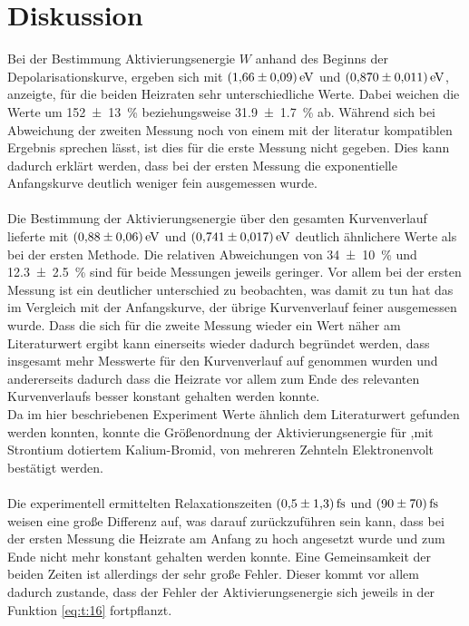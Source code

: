 \section{Diskussion}
\label{sec:Diskussion}
Bei der Bestimmung Aktivierungsenergie $W$ anhand des Beginns der Depolarisationskurve,
ergeben sich mit $\SI{1.66+-0.09}{\electronvolt}$ und $\SI{0.870+-0.011}{\electronvolt}$,
anzeigte, für die beiden Heizraten sehr unterschiedliche Werte. Dabei weichen die Werte um \SI{152+-13}{\percent} beziehungsweise \SI{31.9+-1.7}{\percent} ab.
Während sich bei Abweichung der zweiten Messung noch von einem mit der literatur kompatiblen Ergebnis sprechen lässt, ist dies für die erste Messung nicht
gegeben. Dies kann dadurch erklärt werden, dass bei der ersten Messung die exponentielle Anfangskurve deutlich weniger fein ausgemessen wurde.\\ \\
Die Bestimmung der Aktivierungsenergie über den gesamten Kurvenverlauf lieferte mit
$\SI{0.88+-0.06}{\electronvolt}$ und $\SI{0.741+-0.017}{\electronvolt}$ deutlich ähnlichere Werte als bei der ersten Methode.
Die relativen Abweichungen von \SI{34+-10}{\percent} und \SI{12.3+-2.5}{\percent} sind für beide Messungen jeweils geringer.
Vor allem bei der ersten Messung ist ein deutlicher unterschied zu beobachten, was damit zu tun hat das im Vergleich mit der Anfangskurve, der übrige
Kurvenverlauf feiner ausgemessen wurde. Dass die sich für die zweite Messung wieder ein Wert näher am Literaturwert ergibt kann einerseits wieder
dadurch begründet werden, dass insgesamt mehr Messwerte für den Kurvenverlauf auf genommen wurden und andererseits dadurch dass die Heizrate vor allem
zum Ende des relevanten Kurvenverlaufs besser konstant gehalten werden konnte.\\
Da im hier beschriebenen Experiment Werte ähnlich dem Literaturwert gefunden werden konnten, konnte die Größenordnung der Aktivierungsenergie
für ,mit Strontium dotiertem Kalium-Bromid, von mehreren Zehnteln Elektronenvolt bestätigt werden.\\ \\
Die experimentell ermittelten Relaxationszeiten $\SI{0.5+-1.3}{\femto\second}$ und $\SI{90+-70}{\femto\second}$ weisen eine große Differenz auf,
was darauf zurückzuführen sein kann, dass bei der ersten Messung die Heizrate am Anfang zu hoch angesetzt wurde und zum Ende nicht mehr konstant
gehalten werden konnte. Eine Gemeinsamkeit der beiden Zeiten ist allerdings der sehr große Fehler.
Dieser kommt vor allem dadurch zustande, dass der Fehler der Aktivierungsenergie sich jeweils in der Funktion \eqref{eq:t:16} fortpflanzt.
